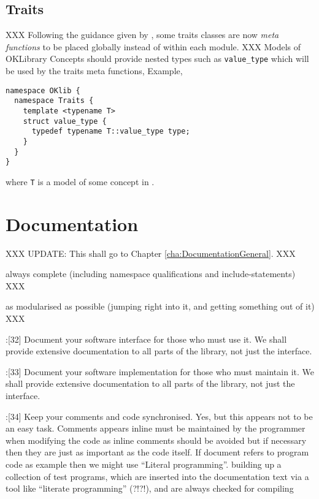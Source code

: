 \documentclass{book}
\newcommand{\name}[1]{\texttt{#1}}
\begin{document}
\section{Traits}
\label{sec:Traits}
  
XXX Following the guidance given by \cite{OKL_AbrahamsGurtovoy2004Metaprogramming}, some traits classes are now \emph{meta functions} to be placed globally instead of within each module. XXX Models of OKLibrary Concepts should provide nested types such as \name{value\_type} which will be used by the traits meta functions, Example,

\begin{verbatim}
namespace OKlib {
  namespace Traits {
    template <typename T>
    struct value_type {
      typedef typename T::value_type type;
    }
  }
}
\end{verbatim}
where \name{T} is a model of some concept in \OKlibrary{}.


\chapter{Documentation}
\label{cha:DocumentationGen}


XXX UPDATE: This shall go to Chapter \ref{cha:DocumentationGeneral}. XXX

always complete (including namespace qualifications and include-statements) XXX

as modularised as possible (jumping right into it, and getting something out of it) XXX

\cite{OKL_MisfeldtBumgardnerGray2004CppStyle}:[32] Document your software interface for those who must use it. We shall provide extensive documentation to all parts of the library, not just the interface.

\cite{OKL_MisfeldtBumgardnerGray2004CppStyle}:[33] Document your software implementation for those who must maintain it. We shall provide extensive documentation to all parts of the library, not just the interface.

\cite{OKL_MisfeldtBumgardnerGray2004CppStyle}:[34] Keep your comments and code synchronised. Yes, but this appears not to be an easy task. Comments appears inline must be maintained by the programmer when modifying the code as inline comments should be avoided but if necessary then they are just as important as the code itself. If document refers to program code as example then we might use ``Literal programming''. building up a collection of test programs, which are inserted into the documentation text via a tool like ``literate programming'' (?!?!), and are always checked for compiling
\end{document}

